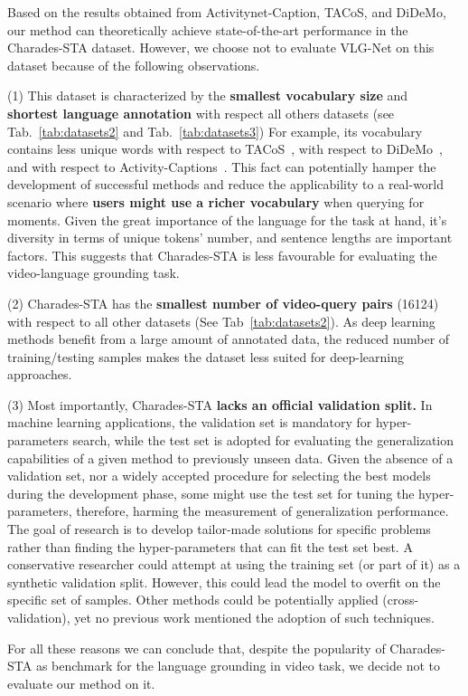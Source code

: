 \documentclass[10pt,twocolumn,letterpaper]{article}
\begin{document}
Based on the results obtained from Activitynet-Caption, TACoS, and DiDeMo, our method can theoretically achieve state-of-the-art performance in the Charades-STA dataset. However, we choose not to evaluate VLG-Net on this dataset because of the following observations.

(1) This dataset is characterized by the \textbf{smallest vocabulary size} and \textbf{shortest language annotation} with respect all others datasets (see Tab.~\ref{tab:datasets2} and Tab.~\ref{tab:datasets3})
For example, its vocabulary contains  less unique words with respect to TACoS~\cite{TACoS_ACL_2013},  with respect to DiDeMo~\cite{Hendricks_2017_ICCV}, and  with respect to Activity-Captions~\cite{Krishna_2017_ICCV}. This fact can potentially hamper the development of successful methods and reduce the applicability to a real-world scenario where \textbf{users might use a richer vocabulary} when querying for moments.
Given the great importance of the language for the task at hand, it's diversity in terms of unique tokens' number, and sentence lengths are important factors. This suggests that Charades-STA is less favourable for evaluating the video-language grounding task.

(2) Charades-STA has the \textbf{smallest number of video-query pairs} (16124) with respect to all other datasets (See Tab~\ref{tab:datasets2}).
As deep learning methods benefit from a large amount of annotated data, the reduced number of training/testing samples makes the dataset less suited for deep-learning approaches. 

(3) Most importantly, Charades-STA \textbf{lacks an official validation split.}
In machine learning applications, the validation set is mandatory for hyper-parameters search, while the test set is adopted for evaluating the generalization capabilities of a given method to previously unseen data. Given the absence of a validation set, nor a widely accepted procedure for selecting the best models during the development phase, some might use the test set for tuning the hyper-parameters, therefore, harming the measurement of generalization performance. 
The goal of research is to develop tailor-made solutions for specific problems rather than finding the hyper-parameters that can fit the test set best.
A conservative researcher could attempt at using the training set (or part of it) as a synthetic validation split. However, this could lead the model to overfit on the specific set of samples. Other methods could be potentially applied (\eg cross-validation), yet no previous work mentioned the adoption of such techniques. 

For all these reasons we can conclude that, despite the popularity of Charades-STA as benchmark for the language grounding in video task, we decide not to evaluate our method on it.


 
\end{document}
